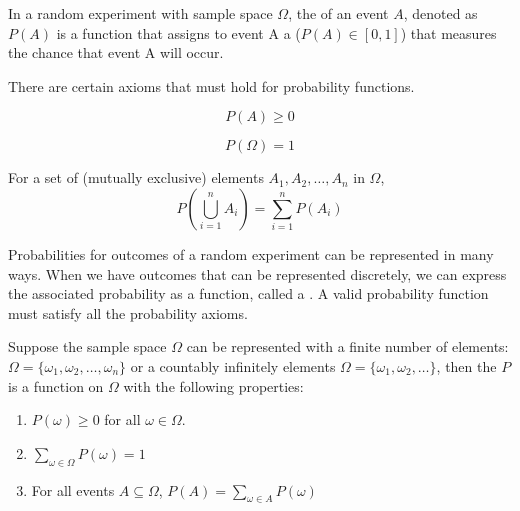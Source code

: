 \begin{definition}[Probability]
    In a random experiment with sample space $\Omega$, the  of an event $A$, denoted as $P(A)$ is a function that assigns to event A a  ($P(A) \in [0, 1]$) that measures the chance that event A will occur. 
\end{definition}

There are certain axioms that must hold for probability functions. 

\begin{axiom}[Axiom 1]
    $$P(A) \ge 0$$
\end{axiom}

\begin{axiom}[Axiom 2]
    $$P(\Omega) = 1$$
\end{axiom}

\begin{axiom}[Axiom 3]
    For a set of  (mutually exclusive) elements $A_1, A_2, \dots, A_n$ in $\Omega$, 
    $$P \left( \bigcup_{i=1}^n A_i \right) = \sum_{i=1}^n P(A_i)$$
\end{axiom}

Probabilities for outcomes of a random experiment can be represented in many ways. When we have outcomes that can be represented discretely, we can express the associated probability as a function, called a . A valid probability function must satisfy all the probability axioms.

\begin{definition}
    Suppose the sample space $\Omega$ can be represented with a finite number of elements: $\Omega = \{ \omega_1, \omega_2, \dots, \omega_n \}$ or a countably infinitely elements $\Omega = \{ \omega_1, \omega_2, \dots \}$, then the  $P$ is a function on $\Omega$ with the following properties:

    \begin{enumerate}
        \item $P(\omega) \ge 0$ for all $\omega \in \Omega$. 
        \item $\sum_{\omega \in \Omega} P(\omega) = 1$
        \item For all events $A \subseteq \Omega$, $P(A) = \sum_{\omega \in A} P(\omega)$
    \end{enumerate}
\end{definition}

